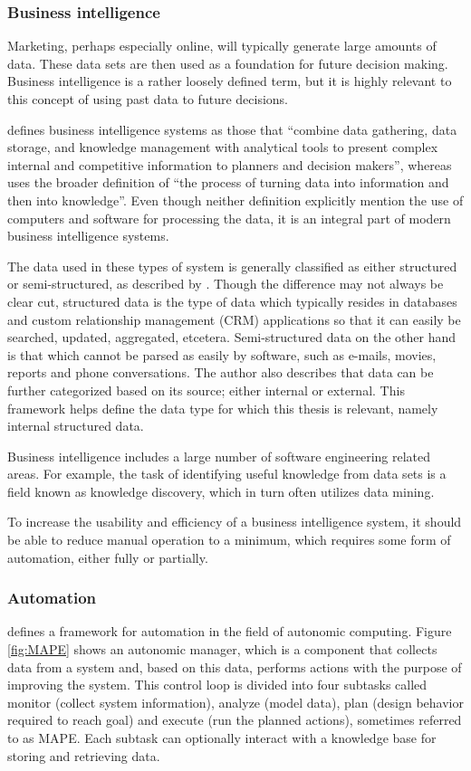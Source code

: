\documentclass{sig-alternate}
\begin{document}
\subsubsection{Business intelligence}
Marketing, perhaps especially online, will typically generate large amounts of data. These data sets are then used as a foundation for future decision making. Business intelligence is a rather loosely defined term, but it is highly relevant to this concept of using past data to future decisions.

\cite{Negash2004} defines business intelligence systems as those that ``combine data gathering, data storage, and knowledge management with analytical tools to present complex internal and competitive information to planners and decision makers'', whereas \cite{Golfarelli2004} uses the broader definition of ``the process of turning data into information and then into knowledge''. Even though neither definition explicitly mention the use of computers and software for processing the data, it is an integral part of modern business intelligence systems.

The data used in these types of system is generally classified as either structured or semi-structured, as described by \cite{Negash2004}. Though the difference may not always be clear cut, structured data is the type of data which typically resides in databases and custom relationship management (CRM) applications so that it can easily be searched, updated, aggregated, etcetera. Semi-structured data on the other hand is that which cannot be parsed as easily by software, such as e-mails, movies, reports and phone conversations. The author also describes that data can be further categorized based on its source; either internal or external. This framework helps define the data type for which this thesis is relevant, namely internal structured data.

Business intelligence includes a large number of software engineering related areas. For example, the task of identifying useful knowledge from data sets is a field known as knowledge discovery, which in turn often utilizes data mining.

To increase the usability and efficiency of a business intelligence system, it should be able to reduce manual operation to a minimum, which requires some form of automation, either fully or partially.

\subsubsection{Automation}
\cite{IBM2006} defines a framework for automation in the field of autonomic computing. Figure \ref{fig:MAPE} shows an autonomic manager, which is a component that collects data from a system and, based on this data, performs actions with the purpose of improving the system. This control loop is divided into four subtasks called monitor (collect system information), analyze (model data), plan (design behavior required to reach goal) and execute (run the planned actions), sometimes referred to as MAPE. Each subtask can optionally interact with a knowledge base for storing and retrieving data.
\end{document}
